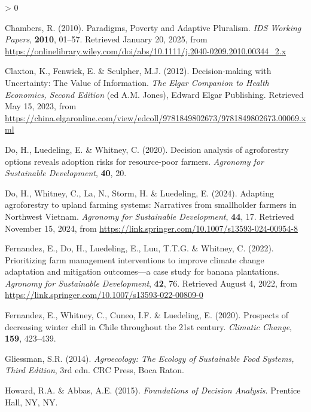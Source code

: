 \documentclass[
]{article}
\newlength{\cslhangindent}
\newenvironment{CSLReferences}[2] %
 {%
  \setlength{\parindent}{0pt}
  \ifodd #1 \everypar{\setlength{\hangindent}{\cslhangindent}}\ignorespaces\fi
  \ifnum #2 > 0
  \setlength{\parskip}{#2\baselineskip}
  \fi
 }%
 {}
\begin{document}
\begin{CSLReferences}{1}{0}
\leavevmode{}%
Chambers, R. (2010). Paradigms, {Poverty} and {Adaptive} {Pluralism}.
\emph{IDS Working Papers}, \textbf{2010}, 01--57. Retrieved January 20,
2025, from
\url{https://onlinelibrary.wiley.com/doi/abs/10.1111/j.2040-0209.2010.00344_2.x}

\leavevmode{}%
Claxton, K., Fenwick, E. \& Sculpher, M.J. (2012). Decision-making with
{Uncertainty}: {The} {Value} of {Information}. \emph{The {Elgar}
{Companion} to {Health} {Economics}, {Second} {Edition}} (ed A.M.
Jones), Edward Elgar Publishing. Retrieved May 15, 2023, from
\url{https://china.elgaronline.com/view/edcoll/9781849802673/9781849802673.00069.xml}

\leavevmode{}%
Do, H., Luedeling, E. \& Whitney, C. (2020). Decision analysis of
agroforestry options reveals adoption risks for resource-poor farmers.
\emph{Agronomy for Sustainable Development}, \textbf{40}, 20.

\leavevmode{}%
Do, H., Whitney, C., La, N., Storm, H. \& Luedeling, E. (2024). Adapting
agroforestry to upland farming systems: Narratives from smallholder
farmers in {Northwest} {Vietnam}. \emph{Agronomy for Sustainable
Development}, \textbf{44}, 17. Retrieved November 15, 2024, from
\url{https://link.springer.com/10.1007/s13593-024-00954-8}

\leavevmode{}%
Fernandez, E., Do, H., Luedeling, E., Luu, T.T.G. \& Whitney, C. (2022).
Prioritizing farm management interventions to improve climate change
adaptation and mitigation outcomes---a case study for banana
plantations. \emph{Agronomy for Sustainable Development}, \textbf{42},
76. Retrieved August 4, 2022, from
\url{https://link.springer.com/10.1007/s13593-022-00809-0}

\leavevmode{}%
Fernandez, E., Whitney, C., Cuneo, I.F. \& Luedeling, E. (2020).
Prospects of decreasing winter chill in {Chile} throughout the 21st
century. \emph{Climatic Change}, \textbf{159}, 423--439.

\leavevmode{}%
Gliessman, S.R. (2014). \emph{Agroecology: {The} {Ecology} of
{Sustainable} {Food} {Systems}, {Third} {Edition}}, 3rd edn. CRC Press,
Boca Raton.

\leavevmode{}%
Howard, R.A. \& Abbas, A.E. (2015). \emph{Foundations of {Decision}
{Analysis}}. Prentice Hall, NY, NY.


\end{CSLReferences}
\end{document}
